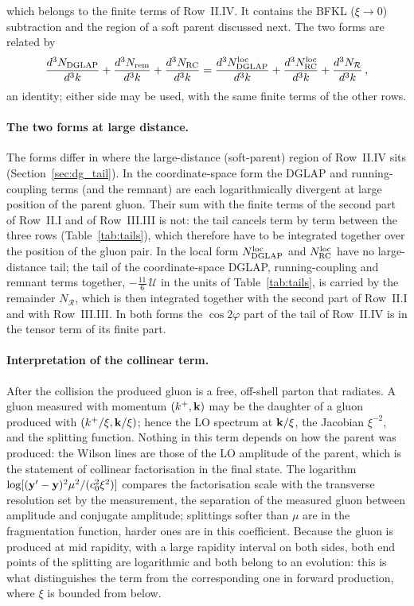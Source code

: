 which belongs to the finite terms of Row~II.IV. It contains the BFKL ($\xi\to0$) subtraction and the region of a soft parent discussed next. The two forms are related by
\begin{align}\label{eq:dg_equiv}
\frac{d^3N_{\rm DGLAP}}{d^3k}+\frac{d^3N_{\rm rem}}{d^3k}+\frac{d^3N_{\rm RC}}{d^3k}=\frac{d^3N^{\rm loc}_{\rm DGLAP}}{d^3k}+\frac{d^3N^{\rm loc}_{\rm RC}}{d^3k}+\frac{d^3N_{\mathcal R}}{d^3k}\,,
\end{align}
an identity; either side may be used, with the same finite terms of the other rows.

\paragraph{The two forms at large distance.} The forms differ in where the large-distance (soft-parent) region of Row~II.IV sits (Section~\ref{sec:dg_tail}). In the coordinate-space form the DGLAP and running-coupling terms (and the remnant) are each logarithmically divergent at large position of the parent gluon. Their sum with the finite terms of the second part of Row~II.I and of Row~III.III is not: the tail cancels term by term between the three rows (Table~\ref{tab:tails}), which therefore have to be integrated together over the position of the gluon pair. In the local form $N^{\rm loc}_{\rm DGLAP}$ and $N^{\rm loc}_{\rm RC}$ have no large-distance tail; the tail of the coordinate-space DGLAP, running-coupling and remnant terms together, $-\frac{11}{6}\,\mathcal U$ in the units of Table~\ref{tab:tails}, is carried by the remainder $N_{\mathcal R}$, which is then integrated together with the second part of Row~II.I and with Row~III.III. In both forms the $\cos2\varphi$ part of the tail of Row~II.IV is in the tensor term of its finite part.

\paragraph{Interpretation of the collinear term.} After the collision the produced gluon is a free, off-shell parton that radiates. A gluon measured with momentum $(k^+,\mathbf{k})$ may be the daughter of a gluon produced with $(k^+/\xi,\mathbf{k}/\xi)$; hence the LO spectrum at $\mathbf{k}/\xi$, the Jacobian $\xi^{-2}$, and the splitting function. Nothing in this term depends on how the parent was produced: the Wilson lines are those of the LO amplitude of the parent, which is the statement of collinear factorisation in the final state. The logarithm $\log[(\mathbf{y}'-\mathbf{y})^2\mu^2/(c_0^2\xi^2)]$ compares the factorisation scale with the transverse resolution set by the measurement, the separation of the measured gluon between amplitude and conjugate amplitude; splittings softer than $\mu$ are in the fragmentation function, harder ones are in this coefficient. Because the gluon is produced at mid rapidity, with a large rapidity interval on both sides, both end points of the splitting are logarithmic and both belong to an evolution: this is what distinguishes the term from the corresponding one in forward production, where $\xi$ is bounded from below.

